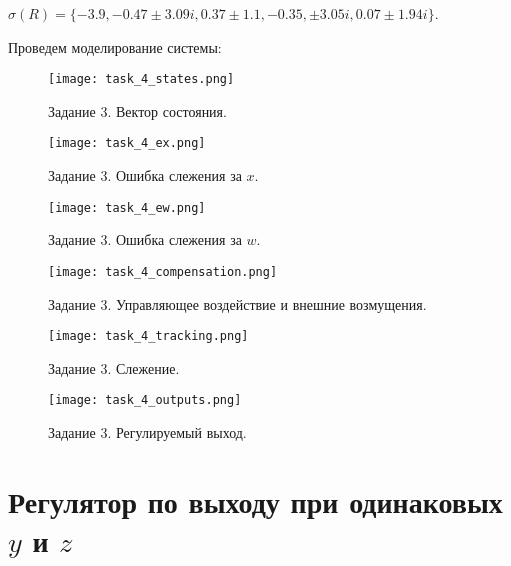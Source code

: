 $\sigma(R)=\{-3.9, -0.47\pm 3.09i, 0.37 \pm 1.1, -0.35, \pm 3.05i, 0.07\pm 1.94i\}$.

Проведем моделирование системы:
\begin{figure}[]
    \centering
    \texttt{[image: task\_4\_states.png]}
    \caption{\label{fig:task4_3_2}Задание 3. Вектор состояния.}
\end{figure}
\begin{figure}[]
    \centering
    \texttt{[image: task\_4\_ex.png]}
    \caption{\label{fig:task4_3_2}Задание 3. Ошибка слежения за $x$.}
\end{figure}
\begin{figure}[]
    \centering
    \texttt{[image: task\_4\_ew.png]}
    \caption{\label{fig:task4_3_2}Задание 3. Ошибка слежения за $w$.}
\end{figure}

\begin{figure}[]
    \centering
    \texttt{[image: task\_4\_compensation.png]}
    \caption{\label{fig:task4_3_2}Задание 3. Управляющее воздействие и внешние возмущения.}
\end{figure}

\begin{figure}[]
    \centering
    \texttt{[image: task\_4\_tracking.png]}
    \caption{\label{fig:task4_3_2}Задание 3. Слежение.}
\end{figure}

\begin{figure}[]
    \centering
    \texttt{[image: task\_4\_outputs.png]}
    \caption{\label{fig:task4_3_2}Задание 3. Регулируемый выход.}
\end{figure}

\pagebreak

\section{Регулятор по выходу при одинаковых $y$ и $z$}

